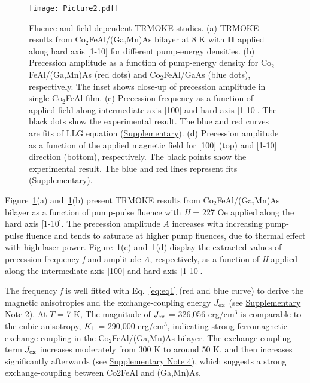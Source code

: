 \documentclass[%
 reprint,
superscriptaddress,
 amsmath,amssymb,
 aps,
prl,
]{revtex4-1}
\begin{document}
\begin{figure}
    \centering
    \advance\leftskip-0.4cm
    \advance\rightskip-0cm
    \texttt{[image: Picture2.pdf]}
    \caption{Fluence and field dependent TRMOKE studies. (a) TRMOKE results from Co$_2$FeAl/(Ga,Mn)As bilayer at 8 K with \textbf{H} applied along hard axis [1-10] for different pump-energy densities. (b) Precession amplitude as a function of pump-energy density for Co$_2$FeAl/(Ga,Mn)As (red dots) and Co$_2$FeAl/GaAs (blue dots), respectively. The inset shows close-up of precession amplitude in single Co$_2$FeAl film. (c) Precession frequency as a function of applied field along intermediate axis [100] and hard axis [1-10]. The black dots show the experimental result. The blue and red curves are fits of LLG equation (\hyperref[sec:Supplementary]{Supplementary}). (d) Precession amplitude as a function of the applied magnetic field for [100] (top) and [1-10] direction (bottom), respectively. The black points show the experimental result. The blue and red lines represent fits (\hyperref[sec:Supplementary]{Supplementary}). 
}
    \label{fig:Fig2}
\end{figure}

Figure~\ref{fig:Fig2}(a) and~\ref{fig:Fig2}(b) present TRMOKE results from Co$_2$FeAl/(Ga,Mn)As bilayer as a function of pump-pulse fluence with \textit{H} = 227 Oe applied along the hard axis [1-10]. The precession amplitude \textit{A} increases with increasing pump-pulse fluence and tends to saturate at higher pump fluences, due to thermal effect with high laser power. Figure~\ref{fig:Fig2}(c) and~\ref{fig:Fig2}(d) display the extracted values of precession frequency \textit{f} and amplitude \textit{A}, respectively, as a function of \textit{H} applied along the intermediate axis [100] and hard axis [1-10]. 

The frequency \textit{f} is well fitted with Eq.~\ref{eq:eq1} (red and blue curve) to derive the magnetic anisotropies and the exchange-coupling energy $J_\textup{ex}$ (see \hyperref[sec:Supplementary]{Supplementary Note 2}). At $T$ = 7 K, The magnitude of $J_\textup{ex}$ = 326,056 erg/cm$^{3}$ is comparable to the cubic anisotropy, $K_\textup{1}$ = 290,000 erg/cm$^{3}$, indicating strong ferromagnetic exchange coupling in the Co$_2$FeAl/(Ga,Mn)As bilayer. The exchange-coupling term $J_\textup{ex}$ increases moderately from 300 K to around 50 K, and then increases significantly afterwards (see \hyperref[sec:Supplementary]{Supplementary Note 4}), which suggests a strong exchange-coupling between Co2FeAl and (Ga,Mn)As.   
\end{document}
